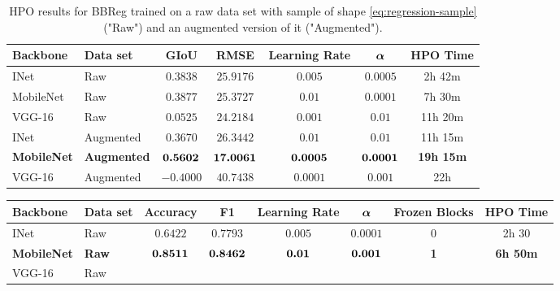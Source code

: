 \begin{landscape}
\begin{table}[!ht]
    \centering
    \begin{tabular}{|l|l|c|c|c|c|c|}
    \hline
         \textbf{Backbone} & \textbf{Data set} & \textbf{GIoU} & \textbf{RMSE} & \textbf{Learning Rate} & $\bm{\alpha}$
         & \textbf{HPO Time}\\

    \hline
        INet & Raw & $0.3838$ & $25.9176$ & $0.005$ & $0.0005$ & 2h 42m\\
    \hline
        MobileNet & Raw & $0.3877$ & $25.3727$ & $0.01$ & $0.0001$ & 7h 30m\\
    \hline
        VGG-16 & Raw & $0.0525$ & $24.2184$ & $0.001$ & $0.01$ & 11h 20m\\
    \hline
    \hline
        INet & Augmented & $0.3670$ & $26.3442$ & $0.01$ & $0.01$ & 11h 15m\\
    \hline
        \textbf{MobileNet}
        & \textbf{Augmented}
        & $\bm{0.5602}$
        & $\bm{17.0061}$
        & $\bm{0.0005}$
        & $\bm{0.0001}$
        & \textbf{19h 15m}\\
    \hline
        VGG-16 & Augmented & $-0.4000$ & $40.7438$ & $0.0001$ & $0.001$ & 22h\\
    \hline
    \end{tabular}
    \caption{HPO results for BBReg trained on a raw data set with sample of shape \eqref{eq:regression-sample} ("Raw") and an augmented version of it ("Augmented").}
    \label{fig:two-stage-regression-results}
\end{table}
\begin{table}[!ht]
    \centering
    \begin{tabular}{|l|l|c|c|c|c|c|c|}
        \hline
         \textbf{Backbone} & \textbf{Data set} &  \textbf{Accuracy} & \textbf{F1} & \textbf{Learning Rate} & $\bm{\alpha}$
         & \textbf{Frozen Blocks} & \textbf{HPO Time}\\
        \hline
        INet &
        Raw &
        $0.6422$ &
        $0.7793$ &
        $0.005$ &
        $0.0001$ &
        0 &
        2h 30
        \\
        \hline
        \textbf{MobileNet} &
        \textbf{Raw} &
        $\bm{0.8511}$ &
        $\bm{0.8462}$ &
        $\bm{0.01}$ &
        $\bm{0.001}$ &
        \textbf{1} &
        \textbf{6h 50m}
        \\
        \hline
        VGG-16 &
        Raw &

\end{tabular}
\end{table}
\end{landscape}
